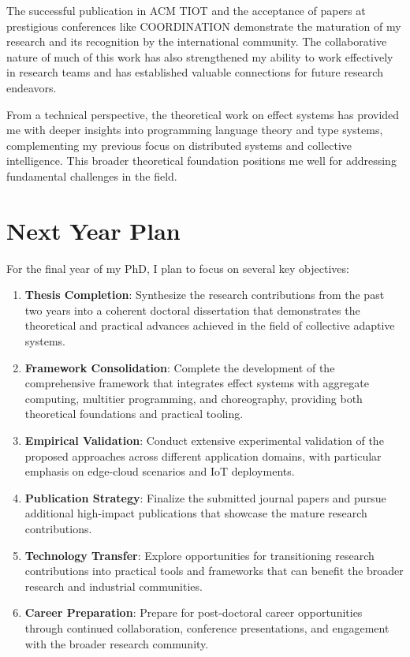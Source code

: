 \documentclass[runningheads]{llncs}
\begin{document}
The successful publication in ACM TIOT and the acceptance of papers at prestigious conferences like COORDINATION demonstrate the maturation of my research and its recognition by the international community. The collaborative nature of much of this work has also strengthened my ability to work effectively in research teams and has established valuable connections for future research endeavors.

From a technical perspective, the theoretical work on effect systems has provided me with deeper insights into programming language theory and type systems, complementing my previous focus on distributed systems and collective intelligence. This broader theoretical foundation positions me well for addressing fundamental challenges in the field.

\section{Next Year Plan}

For the final year of my PhD, I plan to focus on several key objectives:

\begin{enumerate}
\item \textbf{Thesis Completion}: Synthesize the research contributions from the past two years into a coherent doctoral dissertation that demonstrates the theoretical and practical advances achieved in the field of collective adaptive systems.

\item \textbf{Framework Consolidation}: Complete the development of the comprehensive framework that integrates effect systems with aggregate computing, multitier programming, and choreography, providing both theoretical foundations and practical tooling.

\item \textbf{Empirical Validation}: Conduct extensive experimental validation of the proposed approaches across different application domains, with particular emphasis on edge-cloud scenarios and IoT deployments.

\item \textbf{Publication Strategy}: Finalize the submitted journal papers and pursue additional high-impact publications that showcase the mature research contributions.

\item \textbf{Technology Transfer}: Explore opportunities for transitioning research contributions into practical tools and frameworks that can benefit the broader research and industrial communities.

\item \textbf{Career Preparation}: Prepare for post-doctoral career opportunities through continued collaboration, conference presentations, and engagement with the broader research community.
\end{enumerate}
\end{document}
